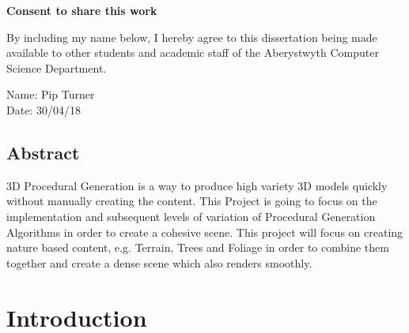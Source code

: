 \documentclass[a4paper,10pt]{report}
\begin{document}
\vspace{1em}
\begin{center}
    {\LARGE\bf Consent to share this work}
\end{center}

By including my name below, I hereby agree to this dissertation being made available to other students and academic staff of the Aberystwyth Computer Science Department.  

\vspace{2em}
Name: Pip Turner  \\

\vspace{1em}
Date: 30/04/18 \\

\setlength{\headheight}{20.2pt}
\pagestyle{fancy}
\setlength{\headsep}{0.2in}
\fancyhf{}

\fancyhead[L]{\leftmark}
\fancyhead[R]{\rightmark}

\fancyfoot[CE,CO]{\leftmark}
\fancyfoot[LE,RO]{\thepage}

\listoffigures
\listoftables

\tableofcontents
\clearpage



\section{Abstract}
3D Procedural Generation is a way to produce high variety 3D models quickly without manually creating the content. This Project is going to focus on the implementation and subsequent levels of variation of Procedural Generation Algorithms in order to create a cohesive scene. This project will focus on creating nature based content, e.g. Terrain, Trees and Foliage in order to combine them together and create a dense scene which also renders smoothly. 
\clearpage
\chapter{Introduction}
\end{document}
